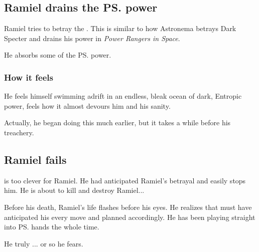 \begin{garbage}
\subsection{Ramiel drains the \ps{\Voidbringer}{} power}
Ramiel tries to betray the \Voidbringer. 
This is similar to how Astronema betrays Dark Specter and drains his power in \emph{Power Rangers in Space}. 

He absorbs some of the \ps{\Voidbringer}{} power. 





\subsubsection{How it feels}
He feels himself swimming adrift in an endless, bleak ocean of dark, Entropic power, feels how it almost devours him and his sanity.


Actually, he began doing this much earlier, but it takes a while before \Daggerrain{}  his treachery. 





\subsection{Ramiel fails}
\Daggerrain{} is too clever for Ramiel. 
He had anticipated Ramiel's betrayal and easily stops him. 
He is about to kill and destroy Ramiel... 

Before his death, Ramiel's life flashes before his eyes. 
He realizes that \Daggerrain{} must have anticipated his every move and planned accordingly. 
He has been playing straight into \ps{\Daggerrain}{} hands the whole time. 

He truly ... 
or so he fears. 


\end{garbage}
